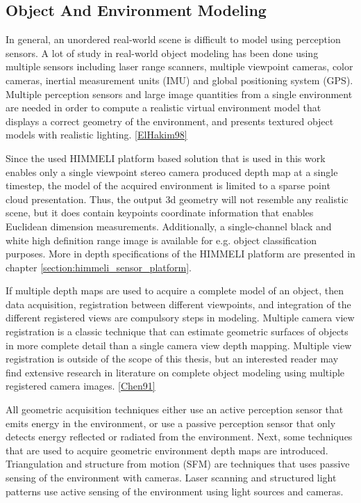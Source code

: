 \documentclass[12pt,a4paper,oneside,pdftex]{report}
\begin{document}
{\subsection{Object And Environment Modeling}

In general, an unordered real-world scene is difficult to model using perception sensors. A lot of study in real-world object modeling has been done using multiple sensors including laser range scanners, multiple viewpoint cameras, color cameras, inertial measurement units (IMU) and global positioning system (GPS). Multiple perception sensors and large image quantities from a single environment are needed in order to compute a realistic virtual environment model that displays a correct geometry of the environment, and presents textured object models with realistic lighting. \ref{ElHakim98}



Since the used HIMMELI platform based solution that is used in this work enables only a single viewpoint stereo camera produced depth map at a single timestep, the model of the acquired environment is limited to a sparse point cloud presentation. Thus, the output 3d geometry will not resemble any realistic scene, but it does contain keypoints coordinate information that enables Euclidean dimension measurements. Additionally, a single-channel black and white high definition range image is available for e.g. object classification purposes. More in depth specifications of the HIMMELI platform are presented in chapter \ref{section:himmeli_sensor_platform}.

If multiple depth maps are used to acquire a complete model of an object, then data acquisition, registration between different viewpoints, and integration of the different registered views are compulsory steps in modeling.  Multiple camera view registration is a classic technique that can estimate geometric surfaces of objects in more complete detail than a single camera view depth mapping. Multiple view registration is outside of the scope of this thesis, but an interested reader may find extensive research in literature on complete object modeling using multiple registered camera images.  \ref{Chen91}

All geometric acquisition techniques either use an active perception sensor that emits energy in the environment, or use a passive perception sensor that only detects energy reflected or radiated from the environment. Next, some techniques that are used to acquire geometric environment depth maps are introduced. Triangulation and structure from motion (SFM) are techniques that uses passive sensing of the environment with cameras. Laser scanning and structured light patterns use active sensing of the environment using light sources and cameras.  

}
\end{document}
